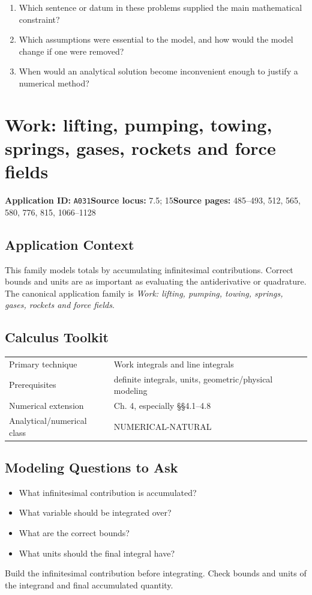 \documentclass[11pt]{book}
\newcommand{\pid}[1]{\texttt{#1}}
\begin{document}
\begin{reflectionbox}\begin{enumerate}
\item Which sentence or datum in these problems supplied the main mathematical constraint?
\item Which assumptions were essential to the model, and how would the model change if one were removed?
\item When would an analytical solution become inconvenient enough to justify a numerical method?
\end{enumerate}\end{reflectionbox}
\chapter{Work: lifting, pumping, towing, springs, gases, rockets and force fields}\label{app:A031}
\textbf{Application ID:} \pid{A031}\quad \textbf{Source locus:} 7.5; 15\quad \textbf{Source pages:} 485–493, 512, 565, 580, 776, 815, 1066–1128
\section*{Application Context}
This family models totals by accumulating infinitesimal contributions. Correct bounds and units are as important as evaluating the antiderivative or quadrature. The canonical application family is \emph{Work: lifting, pumping, towing, springs, gases, rockets and force fields}.
\section*{Calculus Toolkit}
\begin{tabularx}{\textwidth}{@{}lX@{}}\toprule
Primary technique & Work integrals and line integrals \\
Prerequisites & definite integrals, units, geometric/physical modeling \\
Numerical extension & Ch. 4, especially §§4.1–4.8 \\
Analytical/numerical class & NUMERICAL-NATURAL \\
\bottomrule\end{tabularx}
\section*{Modeling Questions to Ask}\begin{itemize}
\item What infinitesimal contribution is accumulated?
\item What variable should be integrated over?
\item What are the correct bounds?
\item What units should the final integral have?
\end{itemize}
\begin{errorbox}Build the infinitesimal contribution before integrating. Check bounds and units of the integrand and final accumulated quantity.\end{errorbox}
\end{document}
